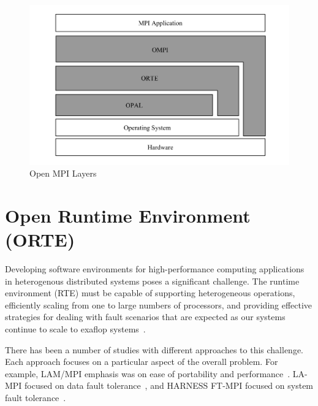 \begin{figure}[ht]
\centering
\includegraphics[scale=0.45]{images/open-mpi-layers.png}
\caption{Open MPI Layers}
\label{fig:open-mpi-layers}
\end{figure}


\section{Open Runtime Environment (ORTE)}
\label{sec:orte}
Developing software environments for high-performance computing applications in heterogenous distributed systems poses a significant challenge. The runtime environment (RTE) must be capable of supporting heterogeneous operations, efficiently scaling from one to large numbers of processors, and providing effective strategies for dealing with fault scenarios that are expected as our systems continue to scale to exaflop systems~\cite{kronstadt2005peta}.

There has been a number of studies with different approaches to this challenge. Each approach focuses on a particular aspect of the overall problem. For example, LAM/MPI emphasis was on ease of portability and performance~\cite{squyres2004component}. LA-MPI focused on data fault tolerance~\cite{aulwes2004architecture}, and HARNESS FT-MPI focused on system fault tolerance~\cite{fagg2002harness}.

